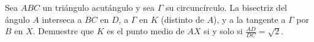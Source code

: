 Sea $ABC$ un triángulo acutángulo y sea $\Gamma$ su circuncírculo. La bisectriz del ángulo $A$ interseca a $BC$ en $D$, a $\Gamma$ en $K$ (distinto de $A$), y a la tangente a $\Gamma$ por $B$ en $X$. Demuestre que $K$ es el punto medio de $AX$ si y solo si $\frac{AD}{DC}=\sqrt2$.
